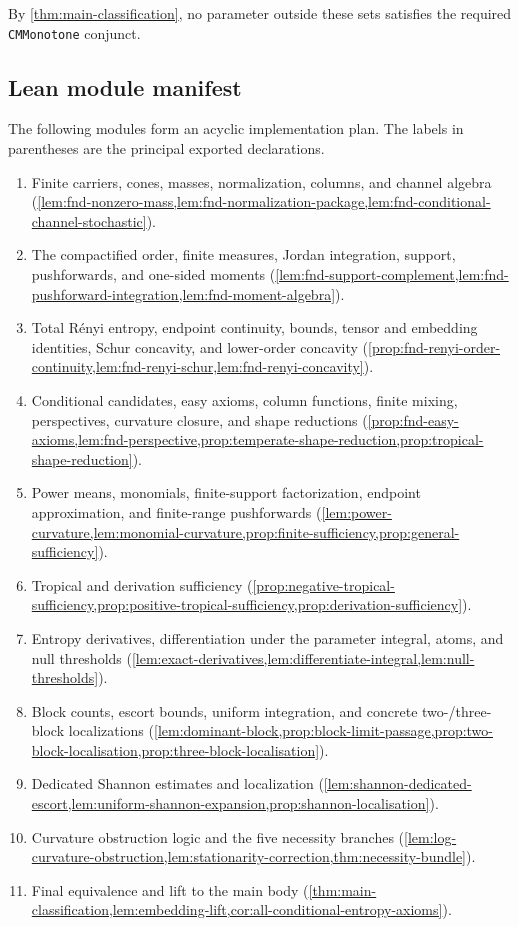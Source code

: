 \documentclass[9pt]{extarticle}
\theoremstyle{definition}
\theoremstyle{remark}
\begin{document}
By \cref{thm:main-classification}, no parameter outside these sets satisfies
the required \texttt{CMMonotone} conjunct.

\subsection{Lean module manifest}

The following modules form an acyclic implementation plan.  The labels in
parentheses are the principal exported declarations.
\begin{enumerate}[label=\texttt{M\arabic*.}]
 \item Finite carriers, cones, masses, normalization, columns, and channel
 algebra
 (\cref{lem:fnd-nonzero-mass,lem:fnd-normalization-package,lem:fnd-conditional-channel-stochastic}).
 \item The compactified order, finite measures, Jordan integration, support,
 pushforwards, and one-sided moments
 (\cref{lem:fnd-support-complement,lem:fnd-pushforward-integration,lem:fnd-moment-algebra}).
 \item Total R\'enyi entropy, endpoint continuity, bounds, tensor and
 embedding identities, Schur concavity, and lower-order concavity
 (\cref{prop:fnd-renyi-order-continuity,lem:fnd-renyi-schur,lem:fnd-renyi-concavity}).
 \item Conditional candidates, easy axioms, column functions, finite mixing,
 perspectives, curvature closure, and shape reductions
 (\cref{prop:fnd-easy-axioms,lem:fnd-perspective,prop:temperate-shape-reduction,prop:tropical-shape-reduction}).
 \item Power means, monomials, finite-support factorization, endpoint
 approximation, and finite-range pushforwards
 (\cref{lem:power-curvature,lem:monomial-curvature,prop:finite-sufficiency,prop:general-sufficiency}).
 \item Tropical and derivation sufficiency
 (\cref{prop:negative-tropical-sufficiency,prop:positive-tropical-sufficiency,prop:derivation-sufficiency}).
 \item Entropy derivatives, differentiation under the parameter integral,
 atoms, and null thresholds
 (\cref{lem:exact-derivatives,lem:differentiate-integral,lem:null-thresholds}).
 \item Block counts, escort bounds, uniform integration, and concrete
 two-/three-block localizations
 (\cref{lem:dominant-block,prop:block-limit-passage,prop:two-block-localisation,prop:three-block-localisation}).
 \item Dedicated Shannon estimates and localization
 (\cref{lem:shannon-dedicated-escort,lem:uniform-shannon-expansion,prop:shannon-localisation}).
 \item Curvature obstruction logic and the five necessity branches
 (\cref{lem:log-curvature-obstruction,lem:stationarity-correction,thm:necessity-bundle}).
 \item Final equivalence and lift to the main body
 (\cref{thm:main-classification,lem:embedding-lift,cor:all-conditional-entropy-axioms}).
\end{enumerate}
\end{document}
